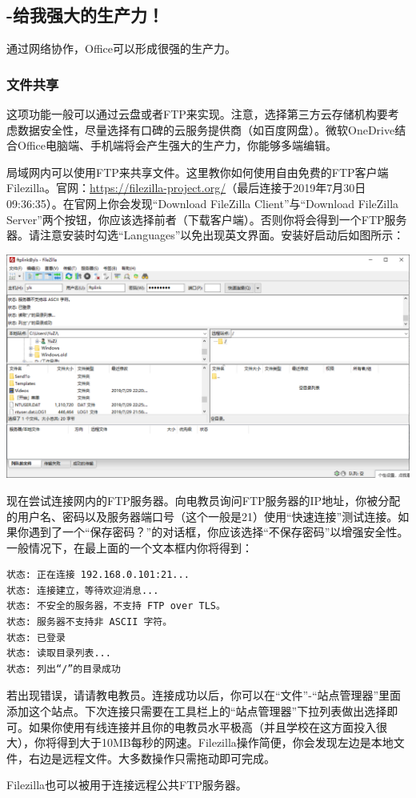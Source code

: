 \subsection{-给我强大的生产力！}
\label{sec:OneDrive}通过网络协作，Office可以形成很强的生产力。
\subsubsection{文件共享}
这项功能一般可以通过云盘或者FTP来实现。注意，选择第三方云存储机构要考虑数据安全性，尽量选择有口碑的云服务提供商（如百度网盘）。微软OneDrive结合Office电脑端、手机端将会产生强大的生产力，你能够多端编辑。\par
局域网内可以使用FTP来共享文件。这里教你如何使用自由免费的FTP客户端Filezilla。官网：\url{https://filezilla-project.org/}（最后连接于2019年7月30日09:36:35）。在官网上你会发现“Download FileZilla Client”与“Download FileZilla Server”两个按钮，你应该选择前者（下载客户端）。否则你将会得到一个FTP服务器。请注意安装时勾选“Languages”以免出现英文界面。安装好启动后如图所示：\par
\begin{center}
	\includegraphics[scale=0.25]{pic/fz}
\end{center} \par
现在尝试连接网内的FTP服务器。向电教员询问FTP服务器的IP地址，你被分配的用户名、密码以及服务器端口号（这个一般是21）使用“快速连接”测试连接。如果你遇到了一个“保存密码？”的对话框，你应该选择“不保存密码”以增强安全性。一般情况下，在最上面的一个文本框内你将得到：
\begin{verbatim}
状态:	正在连接 192.168.0.101:21...
状态:	连接建立，等待欢迎消息...
状态:	不安全的服务器，不支持 FTP over TLS。
状态:	服务器不支持非 ASCII 字符。
状态:	已登录
状态:	读取目录列表...
状态:	列出“/”的目录成功
\end{verbatim}
若出现错误，请请教电教员。连接成功以后，你可以在“文件”-“站点管理器”里面添加这个站点。下次连接只需要在工具栏上的“站点管理器”下拉列表做出选择即可。如果你使用有线连接并且你的电教员水平极高（并且学校在这方面投入很大），你将得到大于10MB每秒的网速。Filezilla操作简便，你会发现左边是本地文件，右边是远程文件。大多数操作只需拖动即可完成。\par
Filezilla也可以被用于连接远程公共FTP服务器。
